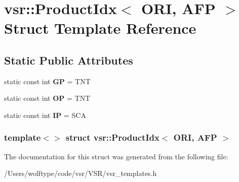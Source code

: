 \hypertarget{structvsr_1_1_product_idx_3_01_o_r_i_00_01_a_f_p_01_4}{\section{vsr\-:\-:Product\-Idx$<$ O\-R\-I, A\-F\-P $>$ Struct Template Reference}
\label{structvsr_1_1_product_idx_3_01_o_r_i_00_01_a_f_p_01_4}
}
\subsection*{Static Public Attributes}
\begin{DoxyCompactItemize}
\item 
\hypertarget{structvsr_1_1_product_idx_3_01_o_r_i_00_01_a_f_p_01_4_a24db4b73018bcdd8b0ac6c0a85937bf0}{static const int {\bfseries G\-P} = T\-N\-T}\label{structvsr_1_1_product_idx_3_01_o_r_i_00_01_a_f_p_01_4_a24db4b73018bcdd8b0ac6c0a85937bf0}

\item 
\hypertarget{structvsr_1_1_product_idx_3_01_o_r_i_00_01_a_f_p_01_4_ae73694262e35a1af5b70a8fee4504b10}{static const int {\bfseries O\-P} = T\-N\-T}\label{structvsr_1_1_product_idx_3_01_o_r_i_00_01_a_f_p_01_4_ae73694262e35a1af5b70a8fee4504b10}

\item 
\hypertarget{structvsr_1_1_product_idx_3_01_o_r_i_00_01_a_f_p_01_4_a1c35639c7a8ceca5ac97faac8705869b}{static const int {\bfseries I\-P} = S\-C\-A}\label{structvsr_1_1_product_idx_3_01_o_r_i_00_01_a_f_p_01_4_a1c35639c7a8ceca5ac97faac8705869b}

\end{DoxyCompactItemize}
\subsubsection*{template$<$$>$ struct vsr\-::\-Product\-Idx$<$ O\-R\-I, A\-F\-P $>$}



The documentation for this struct was generated from the following file\-:\begin{DoxyCompactItemize}
\item 
/\-Users/wolftype/code/vsr/\-V\-S\-R/vsr\-\_\-templates.\-h\end{DoxyCompactItemize}
